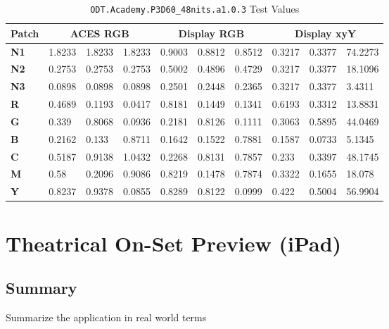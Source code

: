 \begin{table}[ht!]
    \centering
    \begin{tabular}{|l|l|l|l|l|l|l|l|l|l|}
        \hline
        \multicolumn{1}{|c|}{\textbf{Patch}} & \multicolumn{3}{c|}{\textbf{ACES RGB}} & \multicolumn{3}{c|}{\textbf{Display RGB}} & \multicolumn{3}{c|}{\textbf{Display xyY}} \\ \hline
        \textbf{N1} & 1.8233 & 1.8233 & 1.8233 & 0.9003 & 0.8812 & 0.8512 & 0.3217 & 0.3377 & 74.2273 \\
        \textbf{N2} & 0.2753 & 0.2753 & 0.2753 & 0.5002 & 0.4896 & 0.4729 & 0.3217 & 0.3377 & 18.1096 \\
        \textbf{N3} & 0.0898 & 0.0898 & 0.0898 & 0.2501 & 0.2448 & 0.2365 & 0.3217 & 0.3377 & 3.4311  \\
        \textbf{R}  & 0.4689 & 0.1193 & 0.0417 & 0.8181 & 0.1449 & 0.1341 & 0.6193 & 0.3312 & 13.8831 \\
        \textbf{G}  & 0.339  & 0.8068 & 0.0936 & 0.2181 & 0.8126 & 0.1111 & 0.3063 & 0.5895 & 44.0469 \\
        \textbf{B}  & 0.2162 & 0.133  & 0.8711 & 0.1642 & 0.1522 & 0.7881 & 0.1587 & 0.0733 & 5.1345  \\
        \textbf{C}  & 0.5187 & 0.9138 & 1.0432 & 0.2268 & 0.8131 & 0.7857 & 0.233  & 0.3397 & 48.1745 \\
        \textbf{M}  & 0.58   & 0.2096 & 0.9086 & 0.8219 & 0.1478 & 0.7874 & 0.3322 & 0.1655 & 18.078  \\
        \textbf{Y}  & 0.8237 & 0.9378 & 0.0855 & 0.8289 & 0.8122 & 0.0999 & 0.422  & 0.5004 & 56.9904 \\
        \hline
        \end{tabular}
        \caption{\texttt{ODT.Academy.P3D60\_48nits.a1.0.3} Test Values}
        \label{tab:testValues-rec709d60sim}
\end{table}

\clearpage
\section{Theatrical On-Set Preview (iPad)}
\label{sec:ot-app-iPad-d60sim}

\subsection{Summary}
\label{subsec:summary-iPad-d60sim}

Summarize the application in real world terms

